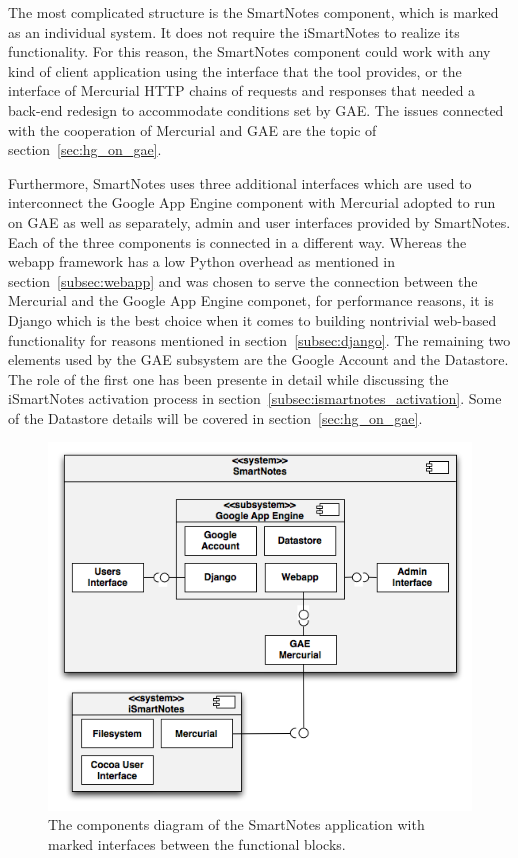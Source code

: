 The most complicated structure is the SmartNotes component, which is marked as an individual system. It does not require the iSmartNotes to realize its functionality. For this reason, the SmartNotes component could work with any kind of client application using the interface that the tool provides, or the interface of Mercurial HTTP chains of requests and responses that needed a back-end redesign to accommodate conditions set by GAE. The issues connected with the cooperation of Mercurial and GAE are the topic of section~\ref{sec:hg_on_gae}. 

Furthermore, SmartNotes uses three additional interfaces which are used to interconnect the Google App Engine component with Mercurial adopted to run on GAE as well as separately, admin and user interfaces provided by SmartNotes. Each of the three components is connected in a different way. Whereas the webapp framework has a low Python overhead as mentioned in section~\ref{subsec:webapp} and was chosen to serve the connection between the Mercurial and the Google App Engine componet, for performance reasons, it is Django which is the best choice when it comes to building nontrivial web-based functionality for reasons mentioned in section~\ref{subsec:django}. The remaining two elements used by the GAE subsystem are the Google Account and the Datastore. The role of the first one has been presente in detail while discussing the iSmartNotes activation process in section~\ref{subsec:ismartnotes_activation}. Some of the Datastore details will be covered in section~\ref{sec:hg_on_gae}. 
\begin{figure}[ht]
\begin{center}
\includegraphics[scale=0.6]{charts/smartnotes_componets.png}
\caption{The components diagram of  the SmartNotes application with marked interfaces between the functional blocks.}
\label{fig:smartnotes_components}
\end{center}
\end{figure}

